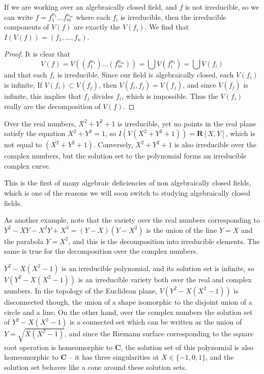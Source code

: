 \begin{corollary}
    If we are working over an algebraically closed field, and $f$ is not irreducible, so we can write $f = f_1^{n_1} \dots f_m^{n_m}$ where each $f_i$ is irreducible, then the irreducible components of $V(f)$ are exactly the $V(f_i)$. We find that $I(V(f)) = (f_1, \dots, f_n)$.
\end{corollary}
\begin{proof}
    It is clear that
    \[ V(f) = V((f_1^{n_1}) \dots (f_m^{n_m})) = \bigcup V(f_i^{n_i}) = \bigcup V(f_i) \]
    and that each $f_i$ is irreducible. Since our field is algebraically closed, each $V(f_i)$ is infinite, If $V(f_i) \subset V(f_j)$, then $V(f_i,f_j) = V(f_j)$, and since $V(f_j)$ is infinite, this implies that $f_j$ divides $f_i$, which is impossible. Thus the $V(f_i)$ really are the decomposition of $V(f)$.
\end{proof}

\begin{example}
    Over the real numbers, $X^2 + Y^2 + 1$ is irreducible, yet no points in the real plane satisfy the equation $X^2 + Y^2 = 1$, so $I(V(X^2 + Y^2 + 1)) = \mathbf{R}[X,Y]$, which is not equal to $(X^2 + Y^2 + 1)$. Conversely, $X^2 + Y^2 + 1$ is also irreducible over the complex numbers, but the solution set to the polynomial forms an irreducible complex curve.
\end{example}

This is the first of many algebraic deficiencies of non algebraically closed fields, which is one of the reasons we will soon switch to studying algebraically closed fields.

\begin{example}
    As another example, note that the variety over the real numbers corresponding to $Y^2 - XY - X^2Y + X^3 = (Y - X)(Y - X^2)$ is the union of the line $Y = X$ and the parabola $Y = X^2$, and this is the decomposition into irreducible elements. The same is true for the decomposition over the complex numbers.
\end{example}

\begin{example}
    $Y^2 - X(X^2 - 1)$ is an irreducible polynomial, and its solution set is infinite, so $V(Y^2 - X(X^2 - 1))$ is an irreducible variety both over the real and complex numbers. In the topology of the Euclidean plane, $V(Y^2 - X(X^2 - 1))$ is disconnected though, the union of a shape isomorphic to the disjoint union of a circle and a line. On the other hand, over the complex numbers the solution set of $Y^2 - X(X^2 - 1)$ is a connected set which can be written as the union of $Y = \sqrt{X(X^2 - 1)}$, and since the Riemann surface corresponding to the square root operation is homeomorphic to $\mathbf{C}$, the solution set of this polynomial is also homeomorphic to $\mathbf{C}$ -- it has three singularities at $X \in \{ -1, 0, 1 \}$, and the solution set behaves like a cone around these solution sets.
\end{example}

